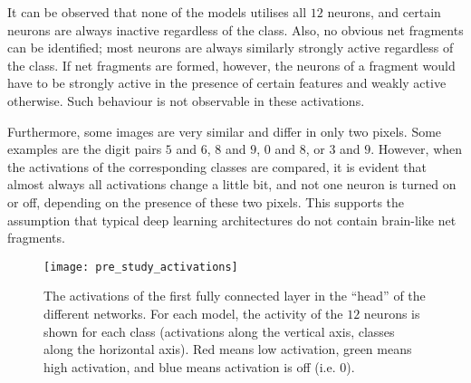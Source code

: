 It can be observed that none of the models utilises all $12$ neurons, and certain neurons are always inactive regardless of the class.
Also, no obvious net fragments can be identified;
most neurons are always similarly strongly active regardless of the class.
If net fragments are formed, however, the neurons of a fragment would have to be strongly active in the presence of certain features and weakly active otherwise.
Such behaviour is not observable in these activations.

Furthermore, some images are very similar and differ in only two pixels.
Some examples are the digit pairs $5$ and $6$, $8$ and $9$, $0$ and $8$, or $3$ and $9$.
However, when the activations of the corresponding classes are compared, it is evident that almost always all activations change a little bit, and not one neuron is turned on or off, depending on the presence of these two pixels. 
This supports the assumption that typical deep learning architectures do not contain brain-like net fragments.

\begin{figure}[h]
    \centering
    \texttt{[image: pre\_study\_activations]}
    \caption[Network activations of the classification networks]{The activations of the first fully connected layer in the ``head'' of the different networks. For each model, the activity of the $12$ neurons is shown for each class (activations along the vertical axis, classes along the horizontal axis). Red means low activation, green means high activation, and blue means activation is off (i.e. $0$).}
\end{figure}



